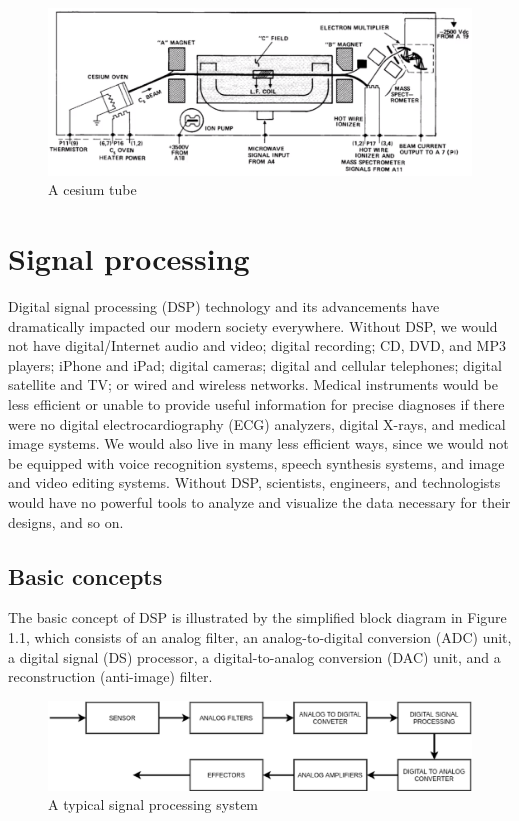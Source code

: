 \begin{figure}[htb] 
	\label{fig:atomic_tube}
	\centering
	\includegraphics[width=\textwidth]{figures/atomic_tube}
	\caption{A cesium tube}
\end{figure}


\section{Signal processing}
\FloatBarrier
Digital signal processing (DSP) technology and its advancements have dramatically impacted our
modern society everywhere. Without DSP, we would not have digital/Internet audio and video;
digital recording; CD, DVD, and MP3 players; iPhone and iPad; digital cameras;
digital and cellular telephones; digital satellite and TV; or wired and wireless networks.
Medical instruments would be less efficient or unable to provide useful information for precise
diagnoses if there were no digital electrocardiography (ECG) analyzers, digital X-rays, and 
medical image systems. We would also live in many less efficient ways, since we would not be
equipped with voice recognition systems, speech synthesis systems, and image and video editing 
systems. Without DSP, scientists, engineers, and technologists would have no powerful tools to
analyze and visualize the data necessary for their designs, and so on.
\subsection{Basic concepts}
\FloatBarrier
The basic concept of DSP is illustrated by the simplified block diagram in Figure 1.1, which
consists of an analog filter, an analog-to-digital conversion (ADC) unit, a digital signal 
(DS) processor, a digital-to-analog conversion (DAC) unit, and a reconstruction (anti-image) 
filter.
\begin{figure}[htb] 
	\label{fig:signal_proc}
	\centering
	\includegraphics[width=\textwidth]{figures/signal_proc}
	\caption{A typical signal processing system}
\end{figure}

